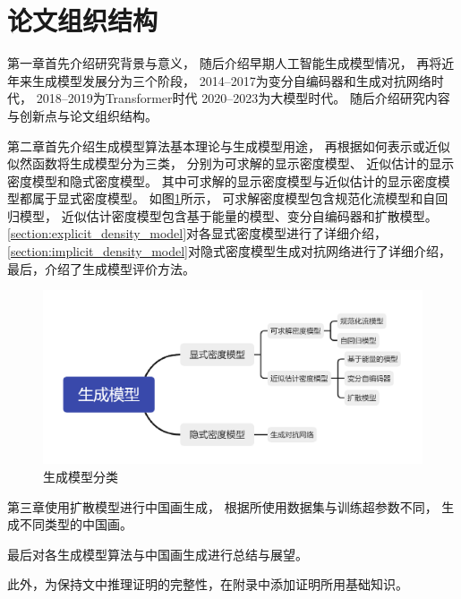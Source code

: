 \section{论文组织结构}

第一章首先介绍研究背景与意义，
随后介绍早期人工智能生成模型情况，
再将近年来生成模型发展分为三个阶段，
2014–2017为变分自编码器和生成对抗网络时代，
2018–2019为Transformer时代
2020–2023为大模型时代。
随后介绍研究内容与创新点与论文组织结构。

第二章首先介绍生成模型算法基本理论与生成模型用途，
再根据如何表示或近似似然函数将生成模型分为三类，
分别为可求解的显示密度模型、
近似估计的显示密度模型和隐式密度模型。
其中可求解的显示密度模型与近似估计的显示密度模型都属于显式密度模型。
如图{\ref{fig:gennerative_models}}所示，
可求解密度模型包含规范化流模型和自回归模型，
近似估计密度模型包含基于能量的模型、变分自编码器和扩散模型。
{\ref{section:explicit_density_model}}对各显式密度模型进行了详细介绍，
{\ref{section:implicit_density_model}}对隐式密度模型生成对抗网络进行了详细介绍，
最后，介绍了生成模型评价方法。
\begin{figure}[ht]
    \centering
    \includegraphics[width=\textwidth]{figures/gennerative_models}
    \caption{生成模型分类}\label{fig:gennerative_models}
\end{figure}



第三章使用扩散模型进行中国画生成，
根据所使用数据集与训练超参数不同，
生成不同类型的中国画。

最后对各生成模型算法与中国画生成进行总结与展望。

此外，为保持文中推理证明的完整性，在附录中添加证明所用基础知识。

